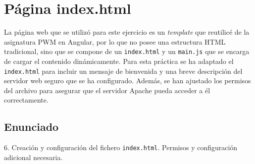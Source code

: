 \chapter{Página index.html}
La página web que se utilizó para este ejercicio es un \emph{template} que reutilicé de la asignatura PWM en Angular,
por lo que no posee una estructura HTML tradicional, sino que se compone de un \texttt{index.html} y un \texttt{main.js}
que se encarga de cargar el contenido dinámicamente. Para esta práctica se ha adaptado el \texttt{index.html} para
incluir un mensaje de bienvenida y una breve descripción del servidor web seguro que se ha configurado. Además, se han
ajustado los permisos del archivo para asegurar que el servidor Apache pueda acceder a él correctamente.
\section{Enunciado}
6. Creación y configuración del fichero \texttt{index.html}. Permisos y configuración adicional necesaria.
